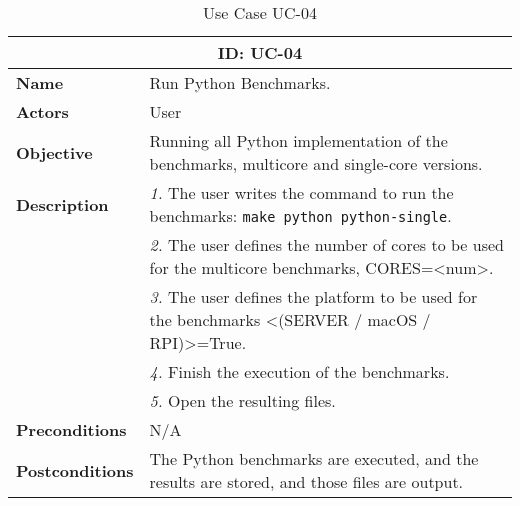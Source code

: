 \begin{table}[H]
    \centering
    \begin{tabular}{l p{10cm}}
        \toprule
        \multicolumn{2}{c}{\textbf{ID: UC-04}} \\
        \toprule
        \textbf{Name}                         &  Run Python Benchmarks. \\
        \textbf{Actors}                       &  User \\
        \textbf{Objective}                    &  Running all Python implementation of the benchmarks, multicore and single-core versions. \\
        \multirow{1}{*}{\textbf{Description}} & \textsl{1.} The user writes the command to run the benchmarks: \texttt{make python python-single}.\\
                                              & \textsl{2.} The user defines the number of cores to be used for the multicore benchmarks, CORES=<num>.\\
                                              & \textsl{3.} The user defines the platform to be used for the benchmarks <(SERVER / macOS / RPI)>=True.\\
                                              & \textsl{4.} Finish the execution of the benchmarks.\\
                                              & \textsl{5.} Open the resulting files.\\ 
        \textbf{Preconditions}                &  N/A \\
        \textbf{Postconditions}               &  The Python benchmarks are executed, and the results are stored, and those files are output. \\
    \end{tabular}
    \caption{Use Case UC-04}
    \label{tab:uc-04}
\end{table}



